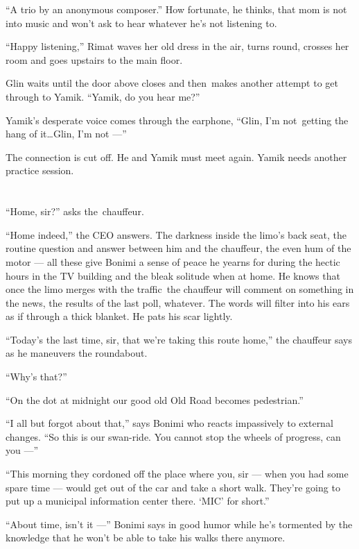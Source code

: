 \documentclass[twoside,11pt,openany]{book}
\begin{document}
``A trio by an anonymous composer.'' How fortunate, he thinks, that mom is not into music and
won't ask to hear whatever he's  not listening to.

``Happy listening,'' Rimat waves her old dress in the air, turns round, crosses her room and
goes upstairs to the main floor.

Glin waits until the door above closes and then~makes another attempt to get through to Yamik. ``Yamik, do
you hear me?''

Yamik's desperate voice comes through the earphone, ``Glin, I'm not~getting the hang of it{\ldots}Glin, I'm
not ---''

The connection is cut off. He and Yamik must meet again. Yamik needs another practice session.



\chapter{}

``Home, sir?'' asks the~chauffeur.

``Home indeed,'' the CEO answers. The darkness inside{ }the limo's back seat,
the routine question and answer between him and the chauffeur, the even hum of the motor --- all these give Bonimi a
sense of peace he yearns for during the hectic hours in the TV building and the{ }bleak solitude when
at home. He knows that once the limo merges with the traffic~the chauffeur will comment on something in the news, the
results of the last poll, whatever.  The words will filter into his ears as if through a thick blanket. He pats his
scar lightly.

``Today's the last time, sir, that we're taking this route home,'' the chauffeur says as he
maneuvers the roundabout.

``Why's that?''

``On the dot at midnight our good old Old Road becomes pedestrian.''

``I all but forgot about that,'' says Bonimi who reacts impassively to external changes.
``So this is our swan-ride. You cannot stop the wheels of progress, can you ---''

``This morning they cordoned off the place where you, sir --- when you had some spare time --- would get out of
the car and take a short walk. They're going to put up a municipal information center there. `MIC' for
short.''

``About time, isn't it ---'' Bonimi says in good humor while he's tormented by the knowledge that he won't
be able to take his walks there anymore. { }
\end{document}
